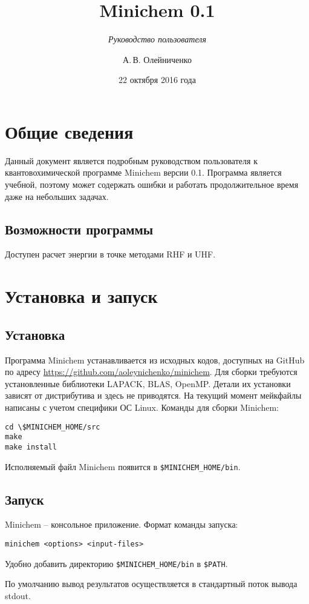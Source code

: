 \documentclass[a4paper]{book}
\title{Minichem 0.1}
\subtitle{\textit{Руководство пользователя}}
\author{А.\,В. Олейниченко}
\date{22 октября 2016 года}
\begin{document}
\maketitle

\chapter{Общие сведения}
Данный документ является подробным руководством пользователя к квантовохимической программе Minichem версии 0.1.
Программа является учебной, поэтому может содержать ошибки и работать продолжительное время даже на небольших задачах.

\section{Возможности программы}
Доступен расчет энергии в точке методами RHF и UHF.

\chapter{Установка и запуск}
\section{Установка}
Программа Minichem устанавливается из исходных кодов, доступных на GitHub по адресу \url{https://github.com/aoleynichenko/minichem}.
Для сборки требуются установленные библиотеки LAPACK, BLAS, OpenMP. Детали их установки зависят от дистрибутива и здесь не приводятся.
На текущий момент мейкфайлы написаны с учетом специфики ОС Linux.
Команды для сборки Minichem:

\begin{lstlisting}
cd \$MINICHEM_HOME/src
make
make install
\end{lstlisting}
Исполняемый файл Minichem появится в \texttt{\$MINICHEM\_HOME/bin}.

\section{Запуск}
Minichem -- консольное приложение. Формат команды запуска:
\begin{lstlisting}
minichem <options> <input-files>
\end{lstlisting}
Удобно добавить директорию \texttt{\$MINICHEM\_HOME/bin} в \texttt{\$PATH}.

По умолчанию вывод результатов осуществляется в стандартный поток вывода stdout.
\end{document}
